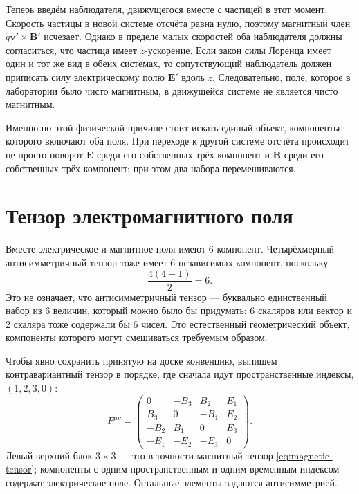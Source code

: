 Теперь введём наблюдателя, движущегося вместе с частицей в этот момент. Скорость частицы в новой системе отсчёта равна нулю, поэтому магнитный член \(q\boldsymbol v'\times\boldsymbol B'\) исчезает. Однако в пределе малых скоростей оба наблюдателя должны согласиться, что частица имеет \(z\)-ускорение. Если закон силы Лоренца имеет один и тот же вид в обеих системах, то сопутствующий наблюдатель должен приписать силу электрическому полю \(\boldsymbol E'\) вдоль \(z\). Следовательно, поле, которое в лаборатории было чисто магнитным, в движущейся системе не является чисто магнитным.

Именно по этой физической причине стоит искать единый объект, компоненты которого включают оба поля. При переходе к другой системе отсчёта происходит не просто поворот \(\boldsymbol E\) среди его собственных трёх компонент и \(\boldsymbol B\) среди его собственных трёх компонент; при этом два набора перемешиваются.

\section{Тензор электромагнитного поля}

Вместе электрическое и магнитное поля имеют 6 компонент. Четырёхмерный антисимметричный тензор тоже имеет 6 независимых компонент, поскольку
\begin{equation}
  \frac{4(4-1)}{2}=6.
\end{equation}
Это не означает, что антисимметричный тензор — буквально единственный набор из 6 величин, который можно было бы придумать: 6 скаляров или вектор и 2 скаляра тоже содержали бы 6 чисел. Это естественный геометрический объект, компоненты которого могут смешиваться требуемым образом.

Чтобы явно сохранить принятую на доске конвенцию, выпишем контравариантный тензор в порядке, где сначала идут пространственные индексы, \((1,2,3,0)\):
\begin{equation}
  F^{\mu\nu}=
  \begin{pmatrix}
    0 & -B_3 & B_2 & E_1 \\
    B_3 & 0 & -B_1 & E_2 \\
    -B_2 & B_1 & 0 & E_3 \\
    -E_1 & -E_2 & -E_3 & 0
  \end{pmatrix}.
  \label{eq:l07-field-tensor}
\end{equation}
Левый верхний блок \(3\times3\) — это в точности магнитный тензор \eqref{eq:magnetic-tensor}; компоненты с одним пространственным и одним временным индексом содержат электрическое поле. Остальные элементы задаются антисимметрией.

